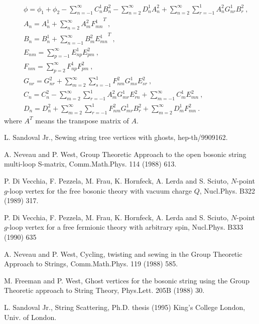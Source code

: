 \documentclass[a4paper,11pt]{article}
\begin{document}
\begin{eqnarray}
 & & \phi =\phi _1+\phi _2-\sum_{n=-1}^\infty C_n^1B_n^2-\sum_{n=2}^\infty D_n^1A_n^2+\sum_{n=2}^\infty \sum_{r=-1}^1A_n^2G_{nr}^1B^2_r\ ,\\ 
 & & A_n=A^1_n+\sum_{n=2}^\infty A_m^2{F_{mn}^1}^T\ ,\\ 
 & & B_n=B_n^1+\sum_{n=-1}^\infty B_m^2{E_{mn}^1}^T\ ,\\
 & & E_{nm}=\sum_{p=-1}^\infty E_{np}^1E_{pm}^2\ ,\\ 
 & & F_{nm}=\sum_{p=2}^\infty F_{np}^1F_{pm}^2\ ,\\ 
 & & G_{nr}=G_{nr}^2+\sum_{m=2}^\infty \sum_{s=-1}^1F_{nm}^2G_{ms}^1E_{sr}^2\ ,\\
 & & C_n=C_n^2-\sum_{m=2}^\infty \sum_{r=-1}^1A_m^2G_{mr}^1E_{rn}^2+\sum_{m=-1}^\infty C_m^1E_{mn}^2\ ,\\
 & & D_n=D_n^2+\sum_{m=2}^\infty \sum_{r=-1}^1F_{nm}^2G_{mr}^1B_r^2+\sum_{m=2}^\infty D_m^1F_{mn}^2\ .
\end{eqnarray}
where $A^T$ means the transpose matrix of $A$.

\begin{thebibliography}{99}

L. Sandoval Jr., Sewing string tree vertices with ghosts, hep-th/9909162.

A. Neveau and P. West, Group Theoretic Approach to the open bosonic string multi-loop S-matrix, Comm.Math.Phys. 114 (1988) 613.

P. Di Vecchia, F. Pezzela, M. Frau, K. Hornfeck, A. Lerda and S. Sciuto, $N$-point $g$-loop vertex for the free bosonic theory with vacuum charge $Q$, Nucl.Phys. B322 (1989) 317.

P. Di Vecchia, F. Pezzela, M. Frau, K. Hornfeck, A. Lerda and S. Sciuto, $N$-point $g$-loop vertex for a free fermionic theory with arbitrary spin, Nucl.Phys. B333 (1990) 635

A. Neveau and P. West, Cycling, twisting and sewing in the Group Theoretic Approach to Strings, Comm.Math.Phys. 119 (1988) 585.

M. Freeman and P. West, Ghost vertices for the bosonic string using the Group Theoretic approach to String Theory, Phys.Lett. 205B (1988) 30.

 L. Sandoval Jr., String Scattering, Ph.D. thesis (1995) King's College London, Univ. of London.

\end{thebibliography}
\end{document}
